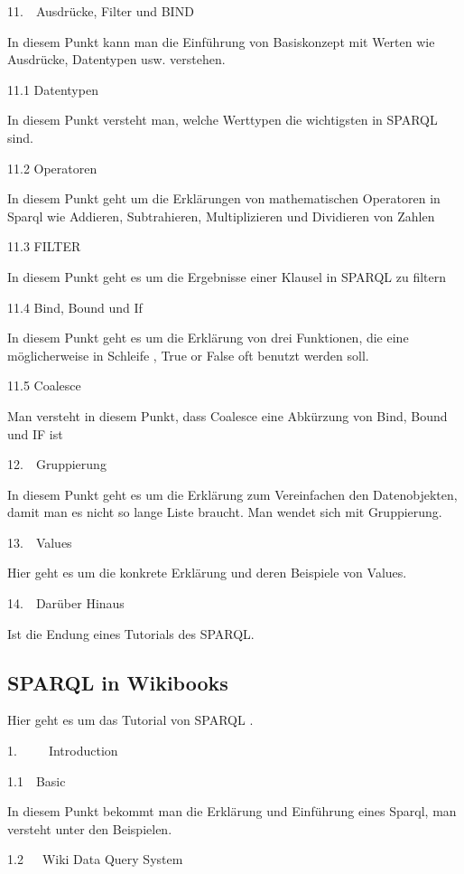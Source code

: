 \documentclass{article}
\begin{document}
11.  Ausdrücke, Filter und BIND


In diesem Punkt kann man die Einführung von Basiskonzept mit Werten wie Ausdrücke, Datentypen usw. verstehen.


11.1 Datentypen 


In diesem Punkt versteht man, welche Werttypen die wichtigsten in SPARQL sind. 


11.2 Operatoren


In diesem Punkt geht um die Erklärungen von mathematischen Operatoren in Sparql wie Addieren, Subtrahieren, Multiplizieren und Dividieren von Zahlen 


11.3 FILTER


In diesem Punkt geht es um die Ergebnisse einer Klausel in SPARQL zu filtern  


11.4 Bind, Bound und If


In diesem Punkt geht es um die Erklärung von drei Funktionen, die eine möglicherweise in Schleife , True or False oft benutzt werden soll.


11.5 Coalesce


Man versteht in diesem Punkt, dass Coalesce eine Abkürzung von Bind, Bound und IF ist


12.  Gruppierung 


In diesem Punkt geht es um die Erklärung zum Vereinfachen den Datenobjekten, damit man es nicht so lange Liste braucht. Man wendet sich mit Gruppierung.


13.  Values


Hier geht es um die konkrete Erklärung und deren Beispiele von Values.


14.  Darüber Hinaus 


Ist die Endung eines Tutorials des SPARQL.





\subsection{SPARQL in Wikibooks }\label{H4372507}



Hier geht es um das Tutorial von SPARQL \autocite{wikibooks_sparql_nodate}.


1.     Introduction 


1.1  Basic


In diesem Punkt bekommt man die Erklärung und Einführung eines Sparql, man versteht unter den Beispielen.


1.2   Wiki Data Query System 
\end{document}
